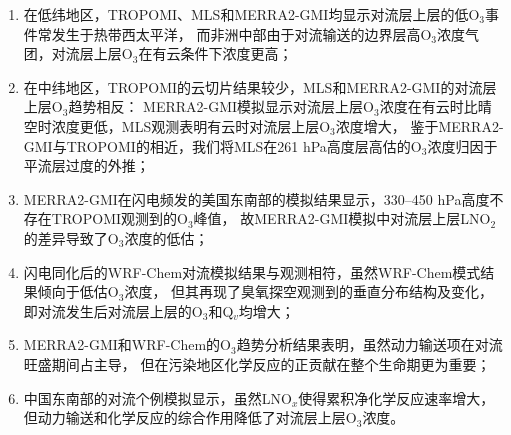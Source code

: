 \begin{enumerate}[label=（\arabic*）, labelindent=\parindent, leftmargin=0pt, widest=0, itemindent=*, topsep=0pt, partopsep=0pt, parsep=0pt]

\item 在低纬地区，TROPOMI、MLS和MERRA2-GMI均显示对流层上层的低O$_3$事件常发生于热带西太平洋，
而非洲中部由于对流输送的边界层高O$_3$浓度气团，对流层上层O$_3$在有云条件下浓度更高；

\item 在中纬地区，TROPOMI的云切片结果较少，MLS和MERRA2-GMI的对流层上层O$_3$趋势相反：
MERRA2-GMI模拟显示对流层上层O$_3$浓度在有云时比晴空时浓度更低，MLS观测表明有云时对流层上层O$_3$浓度增大，
鉴于MERRA2-GMI与TROPOMI的相近，我们将MLS在261 hPa高度层高估的O$_3$浓度归因于平流层过度的外推；

\item MERRA2-GMI在闪电频发的美国东南部的模拟结果显示，330--450 hPa高度不存在TROPOMI观测到的O$_3$峰值，
故MERRA2-GMI模拟中对流层上层LNO$_2$的差异导致了O$_3$浓度的低估；

\item 闪电同化后的WRF-Chem对流模拟结果与观测相符，虽然WRF-Chem模式结果倾向于低估O$_3$浓度，
但其再现了臭氧探空观测到的垂直分布结构及变化，即对流发生后对流层上层的O$_3$和Q$_v$均增大；

\item MERRA2-GMI和WRF-Chem的O$_3$趋势分析结果表明，虽然动力输送项在对流旺盛期间占主导，
但在污染地区化学反应的正贡献在整个生命期更为重要；

\item 中国东南部的对流个例模拟显示，虽然LNO$_x$使得累积净化学反应速率增大，
但动力输送和化学反应的综合作用降低了对流层上层O$_3$浓度。

\end{enumerate}
